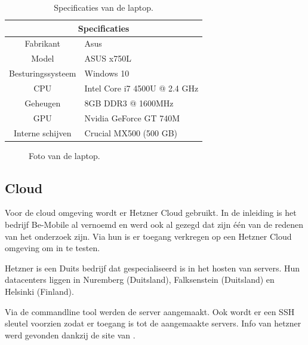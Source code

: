 \begin{table}
	\centering
	\begin{tabular}{c l}
		\hline
		\multicolumn{2}{c}{\textbf{Specificaties}} \\
		\hline
		Fabrikant & Asus \\
		\hline
		Model & ASUS x750L \\
		\hline		
        Besturingssysteem & Windows 10\\
        \hline
		CPU & Intel Core i7 4500U @ 2.4 GHz  \\
		\hline
		Geheugen & 8GB DDR3 @ 1600MHz \\
		\hline
		GPU & Nvidia GeForce GT 740M \\
		\hline
		Interne schijven & Crucial MX500 (500 GB) \\
		\hline
	\end{tabular}
	\caption{Specificaties van de laptop.}
	\label{tab:specs_desktop }
\end{table}

\begin{figure}[!htb]
	\caption{Foto van de laptop.}
	\label{fig:asustest}
\end{figure}


\subsection{Cloud}
Voor de cloud omgeving wordt er Hetzner Cloud gebruikt. In de inleiding is het bedrijf Be-Mobile al vernoemd en werd ook al gezegd dat zijn één van de redenen van het onderzoek zijn. Via hun is er toegang verkregen op een Hetzner Cloud omgeving om in te testen. 

Hetzner is een Duits bedrijf dat gespecialiseerd is in het hosten van servers. Hun datacenters liggen in Nuremberg (Duitsland), Falksenstein (Duitsland) en Helsinki (Finland). 

Via de commandline tool werden de server aangemaakt. Ook wordt er een SSH sleutel voorzien zodat er toegang is tot de aangemaakte servers. Info van hetzner werd gevonden dankzij de site van \autocite{hetzner}.

